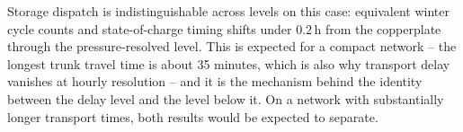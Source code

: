 Storage dispatch is indistinguishable across levels on this case: equivalent winter cycle
counts and state-of-charge timing shifts under $0.2$\,h from the copperplate through the
pressure-resolved level. This is expected for a compact network -- the longest trunk travel
time is about 35 minutes, which is also why transport delay vanishes at hourly resolution
-- and it is the mechanism behind the identity between the delay level and the level below
it. On a network with substantially longer transport times, both results would be expected
to separate.
